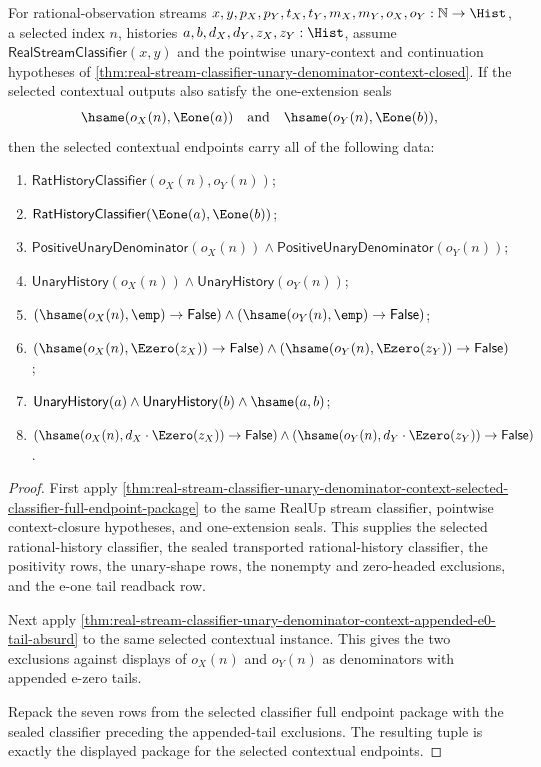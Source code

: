\begin{theorem}
\label{thm:real-stream-classifier-unary-denominator-context-selected-classifier-appended-tail-package}
For rational-observation streams
$x,y,p_X,p_Y,t_X,t_Y,m_X,m_Y,o_X,o_Y:\mathbb{N}\to\Hist$, a selected
index $n$, histories $a,b,d_X,d_Y,z_X,z_Y:\Hist$, assume
$\mathsf{RealStreamClassifier}(x,y)$ and the pointwise unary-context and
continuation hypotheses of
\autoref{thm:real-stream-classifier-unary-denominator-context-closed}. If the
selected contextual outputs also satisfy the one-extension seals
$$
\hsame(o_X(n),\Eone(a))\quad\text{and}\quad \hsame(o_Y(n),\Eone(b)),
$$
then the selected contextual endpoints carry all of the following data:
\begin{enumerate}
\item $\mathsf{RatHistoryClassifier}(o_X(n),o_Y(n))$;
\item $\mathsf{RatHistoryClassifier}(\Eone(a),\Eone(b))$;
\item $\mathsf{PositiveUnaryDenominator}(o_X(n))\land
\mathsf{PositiveUnaryDenominator}(o_Y(n))$;
\item $\mathsf{UnaryHistory}(o_X(n))\land \mathsf{UnaryHistory}(o_Y(n))$;
\item $(\hsame(o_X(n),\emp)\to\mathsf{False})\land
(\hsame(o_Y(n),\emp)\to\mathsf{False})$;
\item $(\hsame(o_X(n),\Ezero(z_X))\to\mathsf{False})\land
(\hsame(o_Y(n),\Ezero(z_Y))\to\mathsf{False})$;
\item $\mathsf{UnaryHistory}(a)\land\mathsf{UnaryHistory}(b)\land\hsame(a,b)$;
\item $(\hsame(o_X(n),d_X\cdot\Ezero(z_X))\to\mathsf{False})\land
(\hsame(o_Y(n),d_Y\cdot\Ezero(z_Y))\to\mathsf{False})$.
\end{enumerate}
\end{theorem}
\begin{proof}
First apply
\autoref{thm:real-stream-classifier-unary-denominator-context-selected-classifier-full-endpoint-package}
to the same RealUp stream classifier, pointwise context-closure hypotheses, and
one-extension seals. This supplies the selected rational-history classifier,
the sealed transported rational-history classifier, the positivity rows, the
unary-shape rows, the nonempty and zero-headed exclusions, and the e-one tail
readback row.

Next apply
\autoref{thm:real-stream-classifier-unary-denominator-context-appended-e0-tail-absurd}
to the same selected contextual instance. This gives the two exclusions against
displays of $o_X(n)$ and $o_Y(n)$ as denominators with appended e-zero tails.

Repack the seven rows from the selected classifier full endpoint package with
the sealed classifier preceding the appended-tail exclusions. The resulting
tuple is exactly the displayed package for the selected contextual endpoints.
\end{proof}

